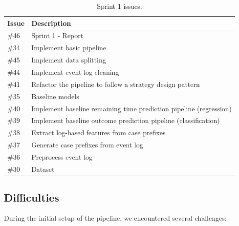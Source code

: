 \documentclass[runningheads]{llncs}
\begin{document}
\begin{table}[H]
    \centering
    \caption{Sprint 1 issues.}
    \label{tab:sprint1_issues}
    \begin{tabularx}{0.75\textwidth}{lX}
        \toprule
        \textbf{Issue} & \textbf{Description}                                               \\
        \midrule
        \#46           & Sprint 1 - Report                                                  \\
        \#34           & Implement basic pipeline                                           \\
        \#45           & Implement data splitting                                           \\
        \#44           & Implement event log cleaning                                       \\
        \#41           & Refactor the pipeline to follow a strategy design pattern          \\
        \#35           & Baseline models                                                    \\
        \#40           & Implement baseline remaining time prediction pipeline (regression) \\
        \#39           & Implement baseline outcome prediction pipeline (classification)    \\
        \#38           & Extract log-based features from case prefixes                      \\
        \#37           & Generate case prefixes from event log                              \\
        \#36           & Preprocess event log                                               \\
        \#30           & Dataset                                                            \\
        \bottomrule
    \end{tabularx}
\end{table}

\subsection{Difficulties}

During the initial setup of the pipeline, we encountered several challenges:
\end{document}
